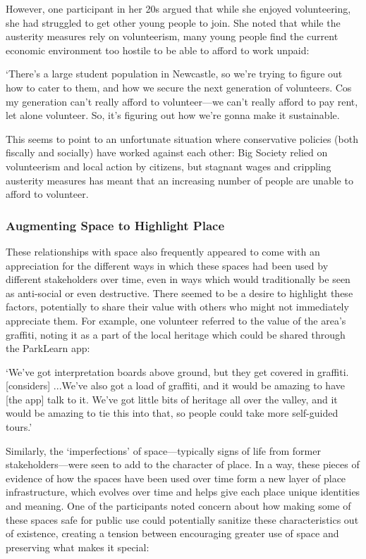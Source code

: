 However, one participant in her 20s argued that while she enjoyed volunteering, she had struggled to get other young people to join. She noted that while the austerity measures rely on volunteerism, many young people find the current economic environment too hostile to be able to afford to work unpaid: 

\begin{displayquote}
`There's a large student population in Newcastle, so we're trying to figure out how to cater to them, and how we secure the next generation of volunteers. Cos my generation can't really afford to volunteer---we can't really afford to pay rent, let alone volunteer. So, it's figuring out how we're gonna make it sustainable.
\end{displayquote}

This seems to point to an unfortunate situation where conservative policies (both fiscally and socially) have worked against each other: Big Society relied on volunteerism and local action by citizens, but stagnant wages and crippling austerity measures has meant that an increasing number of people are unable to afford to volunteer.

\subsubsection{Augmenting Space to Highlight Place}

These relationships with space also frequently appeared to come with an appreciation for the different ways in which these spaces had been used by different stakeholders over time, even in ways which would traditionally be seen as anti-social or even destructive. There seemed to be a desire to highlight these factors, potentially to share their value with others who might not immediately appreciate them. For example, one volunteer referred to the value of the area's graffiti, noting it as a part of the local heritage which could be shared through the ParkLearn app:

\begin{displayquote}
`We've got interpretation boards above ground, but they get covered in graffiti. [considers] ...We've also got a load of graffiti, and it would be amazing to have [the app] talk to it. We've got little bits of heritage all over the valley, and it would be amazing to tie this into that, so people could take more self-guided tours.'
\end{displayquote}

Similarly, the `imperfections' of space---typically signs of life from former stakeholders---were seen to add to the character of place. In a way, these pieces of evidence of how the spaces have been used over time form a new layer of place infrastructure, which evolves over time and helps give each place unique identities and meaning. One of the participants noted concern about how making some of these spaces safe for public use could potentially sanitize these characteristics out of existence, creating a tension between encouraging greater use of space and preserving what makes it special:

